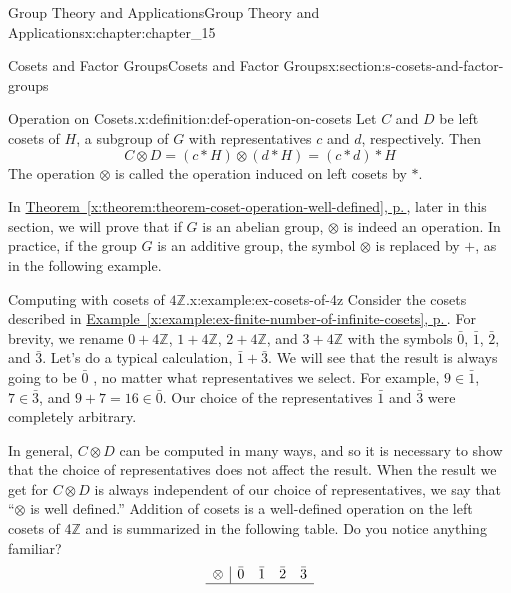 \documentclass[twoside,10pt,]{book}
\newcommand{\xreffont}{\relax}
\numberwithin{equation}{section}
\begin{document}
\begin{chapterptx}{Group Theory and Applications}{}{Group Theory and Applications}{}{}{x:chapter:chapter_15}
\begin{sectionptx}{Cosets and Factor Groups}{}{Cosets and Factor Groups}{}{}{x:section:s-cosets-and-factor-groups}
\begin{definition}{Operation on Cosets.}{x:definition:def-operation-on-cosets}%
%
Let \(C\) and \(D\) be left cosets of \(H\), a subgroup of \(G\) with representatives \(c\) and \(d\), respectively. Then%
\begin{equation*}
C\otimes D = (c*H) \otimes (d*H) = (c*d)*H 
\end{equation*}
The operation \(\otimes\) is called the operation induced on left cosets by \(*\).%
\end{definition}
In \hyperref[x:theorem:theorem-coset-operation-well-defined]{Theorem~{\xreffont\ref{x:theorem:theorem-coset-operation-well-defined}}, p.\,\pageref{x:theorem:theorem-coset-operation-well-defined}}, later in this section, we will prove that if \(G\) is an abelian group, \(\otimes\) is indeed an operation. In practice, if the group \(G\) is an additive group, the symbol \(\otimes\) is replaced by \(+\), as in the following example.%
\begin{example}{Computing with cosets of \(4\mathbb{Z}\).}{x:example:ex-cosets-of-4z}%
Consider the cosets described in \hyperref[x:example:ex-finite-number-of-infinite-cosets]{Example~{\xreffont\ref{x:example:ex-finite-number-of-infinite-cosets}}, p.\,\pageref{x:example:ex-finite-number-of-infinite-cosets}}.  For brevity, we rename \(0+4\mathbb{Z}\), \(1+4\mathbb{Z}\), \(2+4\mathbb{Z}\), and \(3+4\mathbb{Z}\) with the symbols \(\bar{0}\), \(\bar{1}\), \(\bar{2}\), and \(\bar{3}\).   Let's do a typical calculation, \(\bar{1}+\bar{3}\).  We will see that the result is always going to be \(\bar{0}\) , no matter what representatives we select.  For example, \(9 \in  \bar{1}\), \(7\in  \bar{3}\), and \(9+7=16 \in  \bar{0}\). Our choice of the representatives \(\bar{1}\) and \(\bar{3}\) were completely arbitrary.%
\end{example}
In general,  \(C \otimes  D\)  can be computed in many ways, and so it is necessary to show that the choice of representatives does not affect the result. When the result we get for \(C \otimes  D\) is always independent of our choice of representatives, we say that ``\(\otimes\) is well defined.''  Addition of cosets is a well-defined operation on the left cosets of 4\(\mathbb{Z}\) and is summarized in the following table. Do you notice anything familiar?%
\begin{equation*}
\begin{array}{c|cccc}
\otimes & \bar{0} & \bar{1} & \bar{2}  & \bar{3}\\
\hline

\end{array}
\end{equation*}
\end{sectionptx}
\end{chapterptx}
\end{document}
